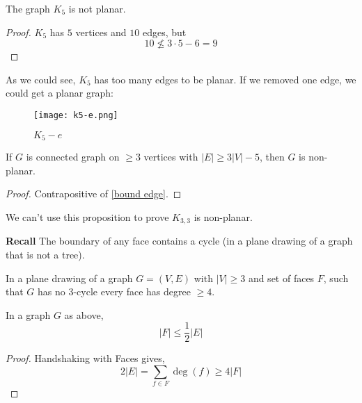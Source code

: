 \begin{thmbox}
    \begin{corollary}
        The graph $ K_5 $ is not planar.
    \end{corollary}
\end{thmbox}
\begin{proof}
    $ K_5 $ has $ 5 $ vertices and $ 10 $ edges, but
    \[ 10\nleqslant 3\cdot 5-6=9 \]
\end{proof}
As we could see, $ K_5 $ has too many edges to be planar.
If we removed one edge, we could get a planar graph:

\begin{figure}[h!]
    \begin{center}
        \texttt{[image: k5-e.png]}
        \caption{$ K_5-e $}
    \end{center}
\end{figure}

\begin{thmbox}
    \begin{prop}
        If $ G $ is connected graph on $ \geqslant 3 $ vertices
        with $ |E|\geqslant 3|V|-5 $, then $ G $ is non-planar.
    \end{prop}
\end{thmbox}
\begin{proof}
    Contrapositive of \ref{bound edge}.
\end{proof}
We can't use this proposition to prove $ K_{3,3} $ is non-planar.

\textbf{Recall} The boundary of any face contains a cycle (in a plane drawing
of a graph that is not a tree).

\begin{thmbox}
    \begin{corollary}
        In a plane drawing of a graph $ G=(V,E) $ with
        $ |V|\geqslant 3 $ and set of faces $ F $, such that
        $ G $ has no $3$-cycle every face
        has degree $ \geqslant 4 $.
    \end{corollary}
\end{thmbox}

\begin{thmbox}
    \begin{corollary}
        In a graph $ G $ as above,
        \[ |F|\leqslant \frac{1}{2} |E| \]
    \end{corollary}
\end{thmbox}
\begin{proof}
    Handshaking with Faces gives,
    \[ 2|E|=\sum\limits_{f\in F}\deg(f)\geqslant 4|F| \]
\end{proof}

